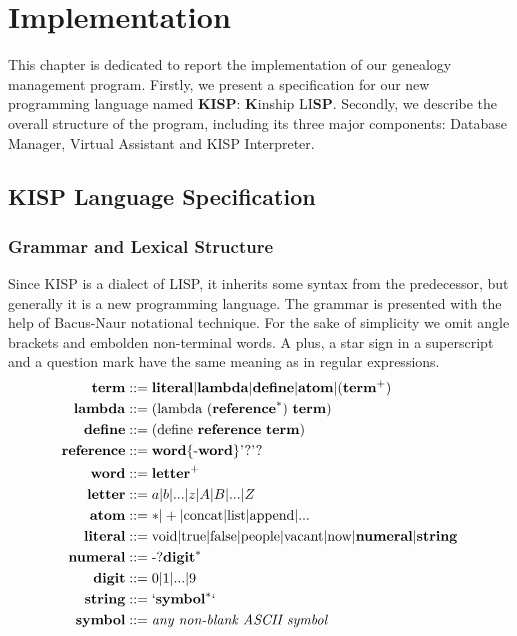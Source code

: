 \chapter{Implementation}
\label{chap:impl}
This chapter is dedicated to report the implementation of our genealogy management program.
Firstly, we present a specification for our new programming language named \textbf{KISP}:
\textbf{K}inship LI\textbf{SP}. Secondly, we describe the overall structure of the program, including its three major components:
Database Manager, Virtual Assistant and KISP Interpreter.

\section{KISP Language Specification}
\subsection{Grammar and Lexical Structure}
    Since KISP is a dialect of LISP, it inherits some syntax from the predecessor, but generally it is a new programming language. The
    grammar is presented with the help of Bacus-Naur notational technique. For the sake of simplicity we omit angle brackets and
    embolden non-terminal words. A plus, a star sign in a superscript and a question mark have the same meaning as in regular
    expressions.
    \begin{align*}
        \text{\textbf{term}} &::= \text{\textbf{literal}} | \text{\textbf{lambda}} | \text{\textbf{define}} | \text{\textbf{atom}} |
            (\text{\textbf{term}}^+) \\
        \text{\textbf{lambda}} &::= (\text{lambda (\textbf{reference}}^*\text{) \textbf{term}}) \\
        \text{\textbf{define}} &::= ( \text{define \textbf{reference} \textbf{term}}) \\
        \text{\textbf{reference}} &::= \text{\textbf{word}\{-\textbf{word}\}'?'?} \\
        \text{\textbf{word}} &::= \text{\textbf{letter}}^+ \\
        \text{\textbf{letter}} &::= a | b | ... | z | A | B | ... | Z \\
        \text{\textbf{atom}} &::= * | + | \text{concat} | \text{list} | \text{append} | ... \\
        \text{\textbf{literal}} &::= \text{void} | \text{true} | \text{false} | \text{people} | \text{vacant} | \text{now} |
            \text{\textbf{numeral}} | \text{\textbf{string}} \\
        \text{\textbf{numeral}} &::= \text{-?\textbf{digit}}^* \\
        \text{\textbf{digit}} &::= 0 | 1 | ... | 9 \\
        \text{\textbf{string}} &::= `\text{\textbf{symbol}}^*` \\
        \text{\textbf{symbol}} &::= \text{\textit{any non-blank ASCII symbol}}
    \label{al:bnf}
    \end{align*}
